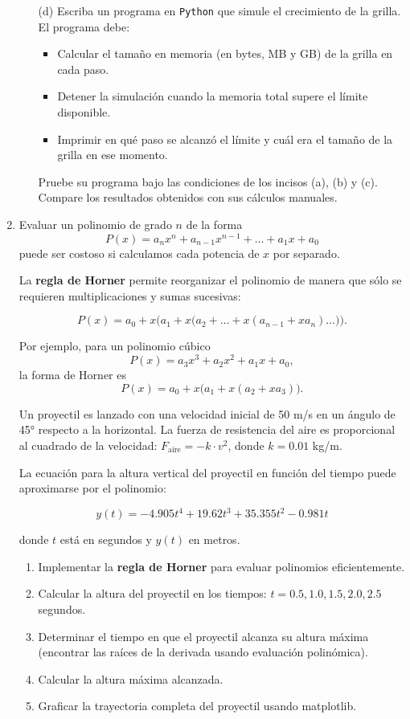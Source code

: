 \documentclass[12pt]{article}
\begin{document}
\begin{enumerate}[label=\textbf{\arabic*.}]
\begin{enumerate}
    \item[(d)] Escriba un programa en \texttt{Python} que simule el crecimiento de la grilla. 
El programa debe:
\begin{itemize}
    \item Calcular el tamaño en memoria (en bytes, MB y GB) de la grilla en cada paso.
    \item Detener la simulación cuando la memoria total supere el límite disponible.
    \item Imprimir en qué paso se alcanzó el límite y cuál era el tamaño de la grilla en ese momento.
\end{itemize}

Pruebe su programa bajo las condiciones de los incisos (a), (b) y (c). 
Compare los resultados obtenidos con sus cálculos manuales.

\end{enumerate}


\item 
Evaluar un polinomio de grado $n$ de la forma
\[
P(x) = a_n x^n + a_{n-1} x^{n-1} + \dots + a_1 x + a_0
\]
puede ser costoso si calculamos cada potencia de $x$ por separado.  

La \textbf{regla de Horner} permite reorganizar el polinomio de manera que sólo se requieren multiplicaciones y sumas sucesivas:

\[
P(x) = a_0 + x \big( a_1 + x \big( a_2 + \dots + x (a_{n-1} + x a_n ) \dots \big) \big).
\]

Por ejemplo, para un polinomio cúbico
\[
P(x) = a_3 x^3 + a_2 x^2 + a_1 x + a_0,
\]
la forma de Horner es
\[
P(x) = a_0 + x \big( a_1 + x (a_2 + x a_3 ) \big).
\]

Un proyectil es lanzado con una velocidad inicial de 50 m/s en un ángulo de 45° respecto a la horizontal. La fuerza de resistencia del aire es proporcional al cuadrado de la velocidad: $F_{\text{aire}} = -k \cdot v^2$, donde $k = 0.01$ kg/m.

La ecuación para la altura vertical del proyectil en función del tiempo puede aproximarse por el polinomio:

\[
y(t) = -4.905t^4 + 19.62t^3 + 35.355t^2 - 0.981t
\]

donde $t$ está en segundos y $y(t)$ en metros.

\begin{enumerate}[label=\alph*)]
\item Implementar la \textbf{regla de Horner} para evaluar polinomios eficientemente.
    \item Calcular la altura del proyectil en los tiempos: $t = 0.5, 1.0, 1.5, 2.0, 2.5$ segundos.
    \item Determinar el tiempo en que el proyectil alcanza su altura máxima (encontrar las raíces de la derivada usando evaluación polinómica).
    \item Calcular la altura máxima alcanzada.
    \item Graficar la trayectoria completa del proyectil usando matplotlib.
\end{enumerate}





\end{enumerate}
\end{document}
